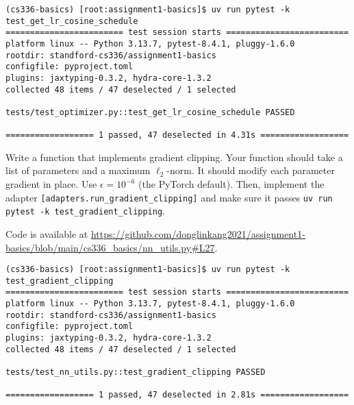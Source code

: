 \begin{lstlisting}
(cs336-basics) [root:assignment1-basics]$ uv run pytest -k test_get_lr_cosine_schedule
======================== test session starts =========================
platform linux -- Python 3.13.7, pytest-8.4.1, pluggy-1.6.0
rootdir: standford-cs336/assignment1-basics
configfile: pyproject.toml
plugins: jaxtyping-0.3.2, hydra-core-1.3.2
collected 48 items / 47 deselected / 1 selected                      

tests/test_optimizer.py::test_get_lr_cosine_schedule PASSED

================== 1 passed, 47 deselected in 4.31s ==================
\end{lstlisting}


Write a function that implements gradient clipping. Your function should take a list of parameters and a maximum $\ell_2$-norm. It should modify each parameter gradient in place. Use $\epsilon = 10^{-6}$ (the PyTorch default). Then, implement the adapter \lstinline{[adapters.run_gradient_clipping]} and make sure it passes \lstinline{uv run pytest -k test_gradient_clipping}.

\begin{answer}
Code is available at \url{https://github.com/donglinkang2021/assignment1-basics/blob/main/cs336_basics/nn_utils.py#L27}.
\end{answer}

\begin{lstlisting}
(cs336-basics) [root:assignment1-basics]$ uv run pytest -k test_gradient_clipping
======================== test session starts =========================
platform linux -- Python 3.13.7, pytest-8.4.1, pluggy-1.6.0
rootdir: standford-cs336/assignment1-basics
configfile: pyproject.toml
plugins: jaxtyping-0.3.2, hydra-core-1.3.2
collected 48 items / 47 deselected / 1 selected                      

tests/test_nn_utils.py::test_gradient_clipping PASSED

================== 1 passed, 47 deselected in 2.81s ==================
\end{lstlisting}
